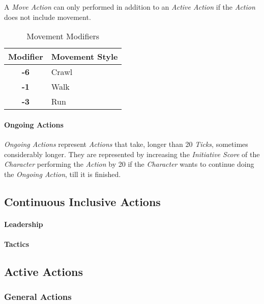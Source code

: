A \emph{Move Action} can only performed in addition to an\emph{ Active Action}
if the \emph{Action} does not include movement.
\begin{table}[htb]
    \caption[Movement Modifiers]{Movement Modifiers}
    \label{tab:movement modifiers}
    \centering
    \begin{tabular}{cl}
        \toprule
        \textbf{Modifier} & \textbf{Movement Style} \\
        \midrule
        \textbf{-6}       & Crawl                   \\
        \textbf{-1}       & Walk                    \\
        \textbf{-3}       & Run                     \\
        \bottomrule
    \end{tabular}
\end{table}

\paragraph{Ongoing Actions}

\emph{Ongoing Actions} represent \emph{Actions} that take, longer than 20
\emph{Ticks}, sometimes considerably longer. They are represented by increasing
the \emph{Initiative Score} of the \emph{Character} performing the \emph{Action}
by 20 if the \emph{Character} wants to continue doing the \emph{Ongoing Action},
till it is finished.

\subsection{Continuous Inclusive Actions}

\paragraph{Leadership}

\paragraph{Tactics}

\subsection{Active Actions}

\subsubsection{General Actions}


